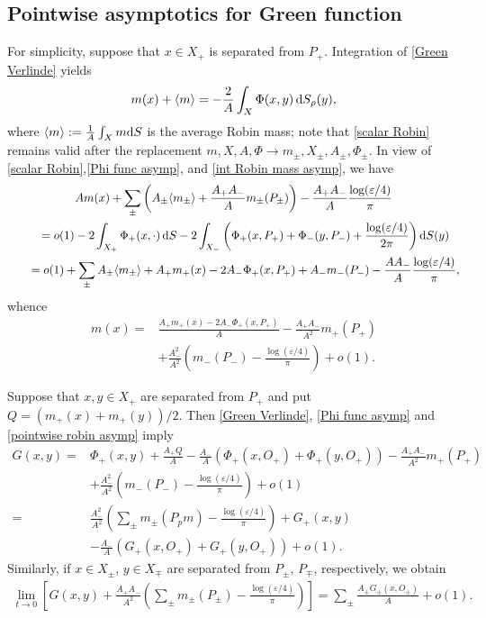 \documentclass[pdftex]{sigma}
\numberwithin{equation}{section}
\theoremstyle{definition}
\begin{document}
\subsection*{Pointwise asymptotics for Green function} For simplicity, suppose that $x\in X_+$ is separated from $P_+$. Integration of \eqref{Green Verlinde} yields
\begin{align}
\label{scalar Robin}
m(x)+\langle m\rangle=-\frac{2}{A}\int_{X}\Phi(x,y)\, {\rm d }S_\rho(y),
\end{align}
where $\langle m\rangle:=\frac{1}{A}\int_X m{\rm d }S$ is the average Robin mass; note that \eqref{scalar Robin} remains valid after the replacement $m,X,A,\Phi\to m_\pm,X_\pm,A_\pm,\Phi_\pm$. In view of \eqref{scalar Robin},\eqref{Phi func asymp}, and \eqref{int Robin mass asymp}, we have
\begin{gather*}
Am(x)+\sum_{\pm}\left(A_\pm\langle m_\pm\rangle+\frac{A_+A_-}{A} m_\pm(P_\pm)\right)-\frac{A_+A_-}{A}\frac{\log (\varepsilon/4)}{\pi}\\
\qquad=o(1)
-2\int_{X_+}\Phi_+(x,\cdot)\,{\rm d }S-2\int_{X_-}\left(\Phi_+(x,P_+)+\Phi_-(y,P_-)+\frac{\log (\varepsilon/4)}{2\pi}\right){\rm d }S(y)\\
\qquad=o(1)
+\sum_{\pm}A_\pm\langle m_\pm\rangle+A_+m_+(x)-2A_-\Phi_+(x,P_+)+A_-m_-(P_-)-\frac{AA_-}{A}\frac{\log (\varepsilon/4)}{\pi},
\end{gather*}
whence
\begin{align}
m(x)={}&\frac{A_+m_+(x)-2A_-\Phi_+(x,P_+)}{A}-\frac{A_+A_-}{A^2}m_+(P_+)\nonumber\\
&+\frac{A_-^2}{A^2}\left(m_-(P_-)-\frac{\log (\varepsilon/4)}{\pi}\right)+o(1).\label{pointwise robin asymp}
\end{align}

Suppose that $x,y\in X_+$ are separated from $P_+$ and put $Q=(m_+(x)+m_+(y))/2$. Then \eqref{Green Verlinde}, \eqref{Phi func asymp} and \eqref{pointwise robin asymp} imply
\begin{align*}
G(x,y)={}&\Phi_+(x,y)+\frac{A_+Q}{A}-\frac{A_-}{A}(\Phi_+(x,O_+)+\Phi_+(y,O_+))-\frac{A_+A_-}{A^2}m_+(P_+)\\
&+\frac{A_-^2}{A^2}\left(m_-(P_-)-\frac{\log (\varepsilon/4)}{\pi}\right)+o(1)\\
={}&\frac{A_-^2}{A^2}\left(\sum_\pm m_\pm(P_pm)-\frac{\log (\varepsilon/4)}{\pi}\right)
+G_+(x,y)\\
&-\frac{A_-}{A}(G_+(x,O_+)+G_+(y,O_+))+o(1).
\end{align*}
Similarly, if $x\in X_\pm$, $y\in X_\mp$ are separated from $P_\pm$, $P_\mp$, respectively, we obtain
\begin{align*}
\lim_{t\to 0}\left[G(x,y)+\frac{A_+A_-}{A^2}\left(\sum_{\pm}m_\pm(P_\pm)-\frac{\log (\varepsilon/4)}{\pi}\right)\right]=\sum_{\pm}\frac{A_\pm G_\pm(x,O_\pm)}{A}+o(1).
\end{align*}
\end{document}
